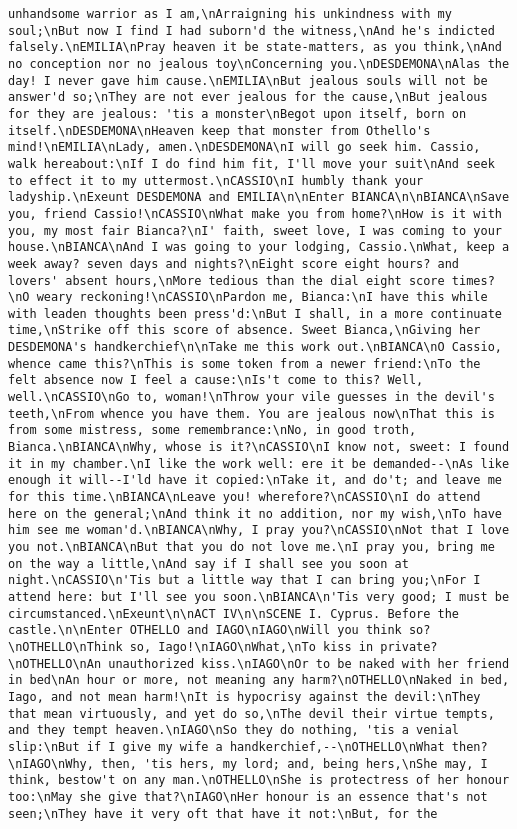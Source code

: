 \begin{verbatim}
unhandsome warrior as I am,\nArraigning his unkindness with my soul;\nBut now I find I had suborn'd the witness,\nAnd he's indicted falsely.\nEMILIA\nPray heaven it be state-matters, as you think,\nAnd no conception nor no jealous toy\nConcerning you.\nDESDEMONA\nAlas the day! I never gave him cause.\nEMILIA\nBut jealous souls will not be answer'd so;\nThey are not ever jealous for the cause,\nBut jealous for they are jealous: 'tis a monster\nBegot upon itself, born on itself.\nDESDEMONA\nHeaven keep that monster from Othello's mind!\nEMILIA\nLady, amen.\nDESDEMONA\nI will go seek him. Cassio, walk hereabout:\nIf I do find him fit, I'll move your suit\nAnd seek to effect it to my uttermost.\nCASSIO\nI humbly thank your ladyship.\nExeunt DESDEMONA and EMILIA\n\nEnter BIANCA\n\nBIANCA\nSave you, friend Cassio!\nCASSIO\nWhat make you from home?\nHow is it with you, my most fair Bianca?\nI' faith, sweet love, I was coming to your house.\nBIANCA\nAnd I was going to your lodging, Cassio.\nWhat, keep a week away? seven days and nights?\nEight score eight hours? and lovers' absent hours,\nMore tedious than the dial eight score times?\nO weary reckoning!\nCASSIO\nPardon me, Bianca:\nI have this while with leaden thoughts been press'd:\nBut I shall, in a more continuate time,\nStrike off this score of absence. Sweet Bianca,\nGiving her DESDEMONA's handkerchief\n\nTake me this work out.\nBIANCA\nO Cassio, whence came this?\nThis is some token from a newer friend:\nTo the felt absence now I feel a cause:\nIs't come to this? Well, well.\nCASSIO\nGo to, woman!\nThrow your vile guesses in the devil's teeth,\nFrom whence you have them. You are jealous now\nThat this is from some mistress, some remembrance:\nNo, in good troth, Bianca.\nBIANCA\nWhy, whose is it?\nCASSIO\nI know not, sweet: I found it in my chamber.\nI like the work well: ere it be demanded--\nAs like enough it will--I'ld have it copied:\nTake it, and do't; and leave me for this time.\nBIANCA\nLeave you! wherefore?\nCASSIO\nI do attend here on the general;\nAnd think it no addition, nor my wish,\nTo have him see me woman'd.\nBIANCA\nWhy, I pray you?\nCASSIO\nNot that I love you not.\nBIANCA\nBut that you do not love me.\nI pray you, bring me on the way a little,\nAnd say if I shall see you soon at night.\nCASSIO\n'Tis but a little way that I can bring you;\nFor I attend here: but I'll see you soon.\nBIANCA\n'Tis very good; I must be circumstanced.\nExeunt\n\nACT IV\n\nSCENE I. Cyprus. Before the castle.\n\nEnter OTHELLO and IAGO\nIAGO\nWill you think so?\nOTHELLO\nThink so, Iago!\nIAGO\nWhat,\nTo kiss in private?\nOTHELLO\nAn unauthorized kiss.\nIAGO\nOr to be naked with her friend in bed\nAn hour or more, not meaning any harm?\nOTHELLO\nNaked in bed, Iago, and not mean harm!\nIt is hypocrisy against the devil:\nThey that mean virtuously, and yet do so,\nThe devil their virtue tempts, and they tempt heaven.\nIAGO\nSo they do nothing, 'tis a venial slip:\nBut if I give my wife a handkerchief,--\nOTHELLO\nWhat then?\nIAGO\nWhy, then, 'tis hers, my lord; and, being hers,\nShe may, I think, bestow't on any man.\nOTHELLO\nShe is protectress of her honour too:\nMay she give that?\nIAGO\nHer honour is an essence that's not seen;\nThey have it very oft that have it not:\nBut, for the 
\end{verbatim}

